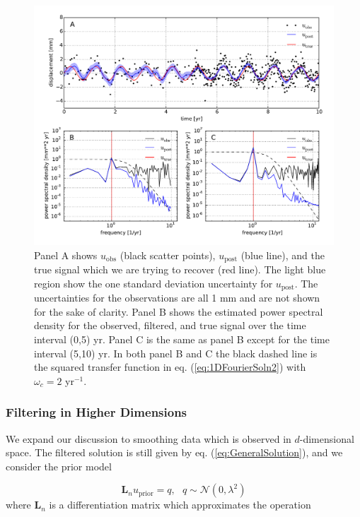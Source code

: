 \documentclass[10pt,a4paper]{article}
\begin{document}
\begin{figure}
\includegraphics[scale=0.7]{figures/fig2}
\caption{Panel A shows $u_\mathrm{obs}$ (black scatter points), $u_\mathrm{post}$ (blue line), and the true signal which we are trying to recover (red line).  The light blue region show the one standard deviation uncertainty for $u_\mathrm{post}$. The uncertainties for the observations are all 1 mm and are not shown for the sake of clarity.  Panel B shows the estimated power spectral density for the observed, filtered, and true signal over the time interval (0,5) yr. Panel C is the same as panel B except for the time interval (5,10) yr.  In both panel B and C the black dashed line is the squared transfer function in eq. (\ref{eq:1DFourierSoln2}) with $\omega_c=2$ yr$^{-1}$.}   
\label{fig:Demo2}
\end{figure}

\subsubsection{Filtering in Higher Dimensions}\label{sec:SmoothingND} 
We expand our discussion to smoothing data which is observed in $d$-dimensional space.  The filtered solution is still given by eq. (\ref{eq:GeneralSolution}), and we consider the prior model

\begin{equation}
  \mathbf{L}_n u_\mathrm{prior} = q, \ \ \ q \sim \mathcal{N}(0,\lambda^2)
\end{equation}  
where $\mathbf{L}_n$ is a differentiation matrix which approximates the operation 
\end{document}

